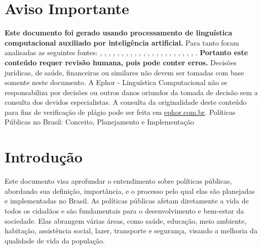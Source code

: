 \documentclass[
   article,       
   12pt,          
   oneside,       
   a4paper,       
   english,       
   brazil,        
   sumario=tradicional
   ]{abntex2}
\begin{document}
\frenchspacing 
\maketitle

\textual
\section{Aviso Importante}
\textbf{Este documento foi gerado usando processamento de linguística computacional auxiliado por inteligência artificial.} Para tanto foram analisadas as seguintes fontes:  \cite{A_CAUSA_E_AS_POLITICAS_DE_DIREITOS_HUMANOS_NO}, \cite{Ciclo_de_Politicas_Publicas_por_que_e_importa}, \cite{Conheca_o_ciclo_das_politicas_publicas__Polit}, \cite{Educacao_Inclusiva_Conheca_o_historico_da_leg}, \cite{Em_Buenos_Aires_Silvio_Almeida_defende_a_inst}, \cite{Entendendo_a_Tipologia_de_Politicas_Publicas_}, \cite{Escola_Nacional_de_Administracao_Publica__Wik}, \cite{Especialista_em_politicas_publicas_e_gestao_g}, \cite{FEDERALISMO_E_POLITICAS_PUBLICAS_NO_BRASIL_Ho}, \cite{Institucionalizacao_das_politicas_em_Direitos}, \cite{Ministerio_do_Planejamento_e_Orcamento__Wikip}, \cite{Ministro_defende_que_direitos_humanos_precisa}, \cite{Politica_conceito_politicas_publicas_e_partid}, \cite{Politica_publica__o_que_e_tipos_de_politicas_}, \cite{Politica_publica__Wikipedia_a_enciclopedia_li}, \cite{Politicas_publicas__Wikipedia_la_enciclopedia}, \cite{Politicas_Publicas_entenda_o_que_sao_para_que}, \cite{Politicas_Publicas_o_que_sao_e_para_que_serve}, \cite{Politicas_publicas_o_que_sao_e_para_que_serve}, \cite{Politicas_publicas_o_que_sao_quem_faz_e_tipos}, \cite{Politicas_publicas_o_que_sao_tipos_e_exemplos}, \cite{Revista_USP_119__Dossie_1_Democracia_e_politi}, \cite{TCU_Ciclo_das_politicas_publicas__Tudo_o_que_}.
\textbf{Portanto este conteúdo requer revisão humana, pois pode conter erros.} Decisões jurídicas, de saúde, financeiras ou similares não devem ser tomadas com base somente neste documento. A Ephor - Linguística Computacional não se responsabiliza por decisões ou outros danos oriundos da tomada de decisão sem a consulta dos devidos especialistas.
A consulta da originalidade deste conteúdo para fins de verificação de plágio pode ser feita em \href{http://www.ephor.com.br}{ephor.com.br}.
Políticas Públicas no Brasil: Conceito, Planejamento e Implementação

\section{Introdução}
Este documento visa aprofundar o entendimento sobre políticas públicas, abordando sua definição, importância, e o processo pelo qual elas são planejadas e implementadas no Brasil. As políticas públicas afetam diretamente a vida de todos os cidadãos e são fundamentais para o desenvolvimento e bem-estar da sociedade. Elas abrangem várias áreas, como saúde, educação, meio ambiente, habitação, assistência social, lazer, transporte e segurança, visando a melhoria da qualidade de vida da população.
\end{document}
